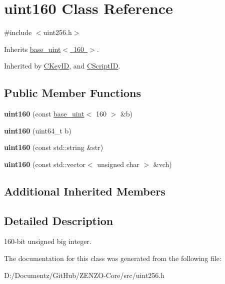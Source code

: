 \hypertarget{classuint160}{}\section{uint160 Class Reference}
\label{classuint160}


{\ttfamily \#include $<$uint256.\+h$>$}



Inherits \mbox{\hyperlink{classbase__uint}{base\+\_\+uint$<$ 160 $>$}}.



Inherited by \mbox{\hyperlink{class_c_key_i_d}{C\+Key\+ID}}, and \mbox{\hyperlink{class_c_script_i_d}{C\+Script\+ID}}.

\subsection*{Public Member Functions}
\begin{DoxyCompactItemize}
\item 
\mbox{\label{classuint160_ae0ba03a9f6b06af48b44963b3d32c2bd}} 
{\bfseries uint160} (const \mbox{\hyperlink{classbase__uint}{base\+\_\+uint}}$<$ 160 $>$ \&b)
\item 
\mbox{\label{classuint160_a1b4399cc586066b0c61401921be5d041}} 
{\bfseries uint160} (uint64\+\_\+t b)
\item 
\mbox{\label{classuint160_a17be565c999f678e47d12e694446e0c4}} 
{\bfseries uint160} (const std\+::string \&str)
\item 
\mbox{\label{classuint160_a92bd85c77e73d6642f9bb7519cbd480c}} 
{\bfseries uint160} (const std\+::vector$<$ unsigned char $>$ \&vch)
\end{DoxyCompactItemize}
\subsection*{Additional Inherited Members}


\subsection{Detailed Description}
160-\/bit unsigned big integer. 

The documentation for this class was generated from the following file\+:\begin{DoxyCompactItemize}
\item 
D\+:/\+Documentz/\+Git\+Hub/\+Z\+E\+N\+Z\+O-\/\+Core/src/uint256.\+h\end{DoxyCompactItemize}
